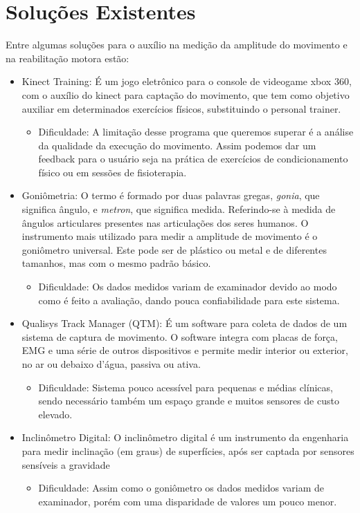 \section{Soluções Existentes}                                                   
\label{Sec:SolucoesExistentes}
Entre algumas soluções para o auxílio na medição da amplitude do movimento
e na reabilitação motora estão:
\begin{itemize}

\item Kinect Training: É um jogo eletrônico para o console de videogame xbox 
360, com o auxílio do kinect para captação do movimento, que tem como objetivo 
auxiliar em determinados exercícios físicos, substituindo o personal trainer.
  \begin{itemize}
  \item Dificuldade: A limitação desse programa que queremos superar é a 
  análise da qualidade da execução do movimento. Assim podemos dar um feedback 
  para o usuário seja na prática de exercícios de  condicionamento físico ou em 
  sessões de fisioterapia.
  \end{itemize}

\item Goniômetria: O termo é formado por duas palavras gregas, \textit{gonia}, 
que significa ângulo, e \textit{metron}, que significa medida. Referindo-se à 
medida de ângulos articulares presentes nas articulações dos seres humanos. 
O instrumento mais utilizado para medir a amplitude de movimento é o goniômetro 
universal. Este pode ser de plástico ou metal e de diferentes tamanhos, mas com
 o mesmo padrão básico\cite{manualGoniometria}.
  \begin{itemize}
  \item Dificuldade: Os dados medidos variam de examinador devido ao modo como 
  é feito a avaliação,  dando pouca confiabilidade para este sistema.
  \end{itemize}

\item Qualisys Track Manager (QTM): É um software para coleta de dados de um 
sistema de captura de movimento. O software integra com placas de força, EMG 
e uma série de outros dispositivos e permite medir interior ou exterior, no ar 
ou debaixo d'água, passiva ou ativa\cite{qtm}.
  \begin{itemize}
  \item Dificuldade: Sistema pouco acessível para pequenas e médias clínicas, 
  sendo necessário também um espaço grande e muitos sensores de custo elevado.
  \end{itemize}

\item Inclinômetro Digital: O inclinômetro digital é um instrumento da 
engenharia para medir inclinação (em graus) de superfícies, após ser captada 
por sensores sensíveis a gravidade\cite{erroMedicao2012}
  \begin{itemize}
  \item Dificuldade: Assim como o goniômetro os dados medidos variam de 
  examinador, porém com uma disparidade de valores um pouco menor.
  \end{itemize}

\end{itemize}
